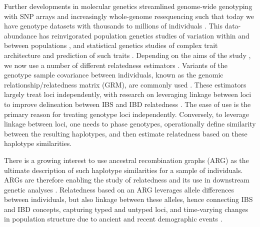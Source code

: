 \begin{tcolorbox}[breakable,pad at break*=1mm, colback=blue!5!white,colframe=blue!75!black,title=Box 1: A Brief History of Genetic Relatedness]

Further developments in molecular genetics streamlined genome-wide
genotyping with SNP arrays and increasingly whole-genome resequencing such
that today we have genotype datasets with thousands to millions of individuals
\citep[e.g.][]{turnbull2018hundred, bycroft2018genome, rosfreixedes2020accuracy}.
%
This data-abundance has reinvigorated population genetics studies of
variation within and between populations
\citep{begun2007population, langley2012genomic},
and statistical genetics studies of
complex trait architecture \citep{burton2007genome, abdellaoui202315} and
prediction of such traits \citep{meuwissen2001prediction, meuwissen2013accelerating}.
%
Depending on the aims of the study \citep{speed2015relatedness}, we now use
a number of different relatedness estimators
\citep[e.g.][]{vanraden2008efficient, yang2010common, manichaikul2010robust,
speed2012improved, weir2017unified, weir2018how, ochoa2021estimating, maryhuard2023fast}.
%
Variants of the genotype sample covariance between individuals,
known as the genomic relationship/relatedness matrix (GRM),
are commonly used \citep{vanraden2008efficient, yang2010common, speed2012improved}.
%
These estimators largely treat loci independently,
with research on leveraging linkage between loci to improve
delineation between IBS and IBD relatedness
\citep[e.g.][]{visscher2006assumption, browning2012identity, thompson2013identity,
hickey2013genomic, edwards2015two, pook2019haploblocker, saada2020identity}.
%
The ease of use is the primary reason for treating genotype loci independently.
%
Conversely, to leverage linkage between loci, one needs to phase genotypes, operationally
define similarity between the resulting haplotypes, and then estimate relatedness
based on these haplotype similarities.


There is a growing interest to use ancestral recombination graphs (ARG)
as the ultimate description of such haplotype similarities for a sample of individuals.
%
ARGs are therefore enabling the study of relatedness and its use in downstream genetic analyses
\citep{fan2022genealogical, tsambos2022efficient, zhang2023biobank, link2023tree, schraiber2024unifying}.
%
Relatedness based on an ARG leverages allele differences between individuals,
but also linkage between these alleles, hence
connecting IBS and IBD concepts,
capturing typed and untyped loci, and
time-varying changes in population structure due to ancient and recent demographic events
\citep{fan2022genealogical, young2022discovering, zhang2023biobank, harris2023using}.

\end{tcolorbox}